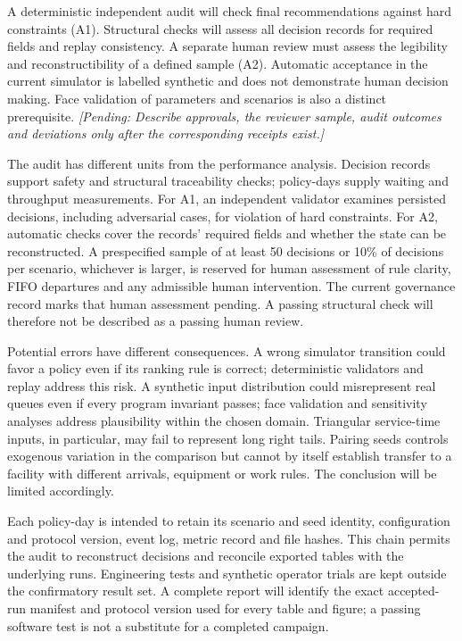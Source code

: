 \documentclass[12pt,a4paper]{article}
\newcommand{\pending}[1]{\textcolor{black!70}{\emph{[Pending: #1]}}}
\begin{document}
A deterministic independent audit will check final recommendations against hard constraints (A1). Structural checks will assess all decision records for required fields and replay consistency. A separate human review must assess the legibility and reconstructibility of a defined sample (A2). Automatic acceptance in the current simulator is labelled synthetic and does not demonstrate human decision making. Face validation of parameters and scenarios is also a distinct prerequisite. \pending{Describe approvals, the reviewer sample, audit outcomes and deviations only after the corresponding receipts exist.}

The audit has different units from the performance analysis. Decision records support safety and structural traceability checks; policy-days supply waiting and throughput measurements. For A1, an independent validator examines persisted decisions, including adversarial cases, for violation of hard constraints. For A2, automatic checks cover the records' required fields and whether the state can be reconstructed. A prespecified sample of at least 50 decisions or 10\% of decisions per scenario, whichever is larger, is reserved for human assessment of rule clarity, FIFO departures and any admissible human intervention. The current governance record marks that human assessment pending. A passing structural check will therefore not be described as a passing human review.

Potential errors have different consequences. A wrong simulator transition could favor a policy even if its ranking rule is correct; deterministic validators and replay address this risk. A synthetic input distribution could misrepresent real queues even if every program invariant passes; face validation and sensitivity analyses address plausibility within the chosen domain. Triangular service-time inputs, in particular, may fail to represent long right tails. Pairing seeds controls exogenous variation in the comparison but cannot by itself establish transfer to a facility with different arrivals, equipment or work rules. The conclusion will be limited accordingly.

Each policy-day is intended to retain its scenario and seed identity, configuration and protocol version, event log, metric record and file hashes. This chain permits the audit to reconstruct decisions and reconcile exported tables with the underlying runs. Engineering tests and synthetic operator trials are kept outside the confirmatory result set. A complete report will identify the exact accepted-run manifest and protocol version used for every table and figure; a passing software test is not a substitute for a completed campaign.
\end{document}
